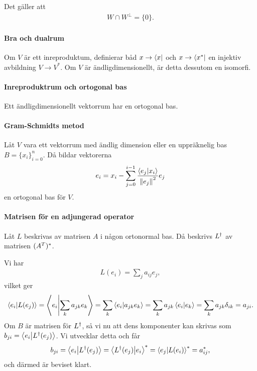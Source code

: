 \proof
Det gäller att
\begin{align*}
	W \cap W^{\perp} = \{0\}.
\end{align*}

\paragraph{Bra och dualrum}
Om $V$ är ett inreproduktum, definierar båd $x\to\bra{x}$ och $x\to\bra{x^{*}}$ en injektiv avbildning $V\to V^{*}$. Om $V$ är ändligdimensionellt, är detta dessutom en isomorfi.

\proof

\paragraph{Inreproduktrum och ortogonal bas}
Ett ändligdimensionellt vektorrum har en ortogonal bas.

\proof

\paragraph{Gram-Schmidts metod}
Låt $V$ vara ett vektorrum med ändlig dimension eller en uppräknelig bas $B = \{x_{i}\}_{i= 0}^{n}$. Då bildar vektorerna
\begin{align*}
	e_{i} = x_{i} - \sum\limits_{j = 0}^{i - 1}\frac{\bra{e_{j}}\ket{x_{i}}}{\norm{e_{j}}^{2}}e_{j}
\end{align*}
en ortogonal bas för $V$.

\proof

\paragraph{Matrisen för en adjungerad operator}
Låt $L$ beskrivas av matrisen $A$ i någon ortonormal bas. Då beskrivs $L^{\dagger}$ av matrisen $(A^{T})^{*}$.

\proof
Vi har
\begin{align*}
	L(e_{i}) = \sum\limits_{j}a_{ij}e_{j},
\end{align*}
vilket ger
\begin{align*}
	\bra{e_{i}}\ket{L(e_{j})} = \bra{e_{i}}\ket{\sum\limits_{k}a_{jk}e_{k}} = \sum\limits_{k}\bra{e_{i}}\ket{a_{jk}e_{k}} = \sum\limits_{k}a_{jk}\bra{e_{i}}\ket{e_{k}} = \sum\limits_{k}a_{jk}\delta_{ik} = a_{ji}.
\end{align*}
Om $B$ är matrisen för $L^{\dagger}$, så vi nu att dens komponenter kan skrivas som $b_{ji} = \bra{e_{i}}\ket{L^{\dagger}(e_{j})}$. Vi utvecklar detta och får
\begin{align*}
	b_{ji} = \bra{e_{i}}\ket{L^{\dagger}(e_{j})} = \bra{L^{\dagger}(e_{j})}\ket{e_{i}}^{*} = \bra{e_{j}}\ket{L(e_{i})}^{*} = a_{ij}^{*},
\end{align*}
och därmed är beviset klart.

